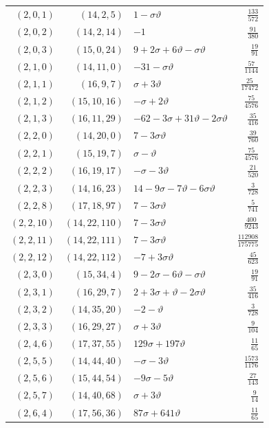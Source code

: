 \begin{longtable}{rrlr}
$(2,0,1)$ & $(14,2,5)$ & $1-\sigma\vartheta$ & $\frac{133}{572}$\\
$(2,0,2)$ & $(14,2,14)$ & $-1$ & $\frac{91}{380}$\\
$(2,0,3)$ & $(15,0,24)$ & $9+2\sigma+6\vartheta-\sigma\vartheta$ & $\frac{19}{91}$\\
$(2,1,0)$ & $(14,11,0)$ & $-31-\sigma\vartheta$ & $\frac{57}{1144}$\\
$(2,1,1)$ & $(16,9,7)$ & $\sigma+3\vartheta$ & $\frac{25}{17472}$\\
$(2,1,2)$ & $(15,10,16)$ & $-\sigma+2\vartheta$ & $\frac{75}{4576}$\\
$(2,1,3)$ & $(16,11,29)$ & $-62-3\sigma+31\vartheta-2\sigma\vartheta$ & $\frac{35}{416}$\\
$(2,2,0)$ & $(14,20,0)$ & $7-3\sigma\vartheta$ & $\frac{39}{760}$\\
$(2,2,1)$ & $(15,19,7)$ & $\sigma-\vartheta$ & $\frac{75}{4576}$\\
$(2,2,2)$ & $(16,19,17)$ & $-\sigma-3\vartheta$ & $\frac{21}{520}$\\
$(2,2,3)$ & $(14,16,23)$ & $14-9\sigma-7\vartheta-6\sigma\vartheta$ & $\frac{3}{728}$\\
$(2,2,8)$ & $(17,18,97)$ & $7-3\sigma\vartheta$ & $\frac{5}{741}$\\
$(2,2,10)$ & $(14,22,110)$ & $7-3\sigma\vartheta$ & $\frac{400}{9243}$\\
$(2,2,11)$ & $(14,22,111)$ & $7-3\sigma\vartheta$ & $\frac{112908}{175775}$\\
$(2,2,12)$ & $(14,22,112)$ & $-7+3\sigma\vartheta$ & $\frac{45}{623}$\\
$(2,3,0)$ & $(15,34,4)$ & $9-2\sigma-6\vartheta-\sigma\vartheta$ & $\frac{19}{91}$\\
$(2,3,1)$ & $(16,29,7)$ & $2+3\sigma+\vartheta-2\sigma\vartheta$ & $\frac{35}{416}$\\
$(2,3,2)$ & $(14,35,20)$ & $-2-\vartheta$ & $\frac{3}{728}$\\
$(2,3,3)$ & $(16,29,27)$ & $\sigma+3\vartheta$ & $\frac{9}{104}$\\
$(2,4,6)$ & $(17,37,55)$ & $129\sigma+197\vartheta$ & $\frac{11}{65}$\\
$(2,5,5)$ & $(14,44,40)$ & $-\sigma-3\vartheta$ & $\frac{1573}{1176}$\\
$(2,5,6)$ & $(15,44,54)$ & $-9\sigma-5\vartheta$ & $\frac{27}{143}$\\
$(2,5,7)$ & $(14,40,68)$ & $\sigma+3\vartheta$ & $\frac{9}{14}$\\
$(2,6,4)$ & $(17,56,36)$ & $87\sigma+641\vartheta$ & $\frac{11}{65}$\\

\end{longtable}
